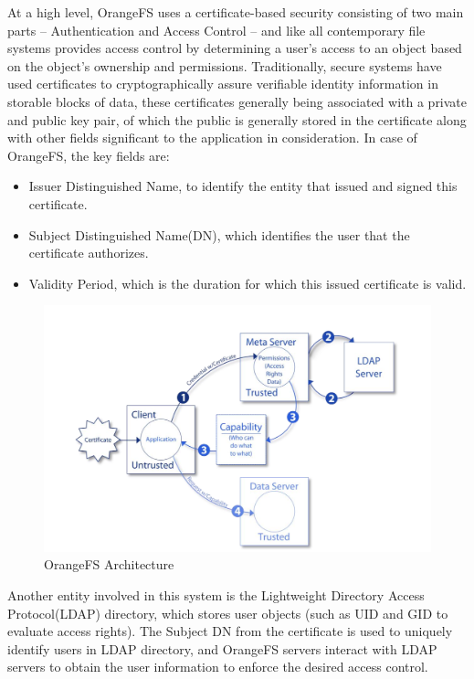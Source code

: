 At a high level, OrangeFS uses a certificate-based security consisting of two main parts -- Authentication and Access Control -- and like all contemporary file systems provides access control by determining a user's access to an object based on the object's ownership and permissions. Traditionally, secure systems have used certificates to cryptographically assure verifiable identity information in storable blocks of data, these certificates generally being associated with a private and public key pair, of which the public is generally stored in the certificate along with other fields significant to the application in consideration. In case of OrangeFS, the key fields are:
\begin{itemize}
\item Issuer Distinguished Name, to identify the entity that issued and signed this certificate.
\item Subject Distinguished Name(DN), which identifies the user that the certificate authorizes.
\item Validity Period, which is the duration for which this issued certificate is valid.
\end{itemize} 

\begin{figure}[h]
\centering
\includegraphics[scale = 0.25]{img/orange}
\caption{OrangeFS Architecture}
\label{orange}
\end{figure}

Another entity involved in this system is the Lightweight Directory Access Protocol(LDAP) directory, which stores user objects (such as UID and GID to evaluate access rights). The Subject DN from the certificate is used to uniquely identify users in LDAP directory, and OrangeFS servers interact with LDAP servers to obtain the user information to enforce the desired access control. 

